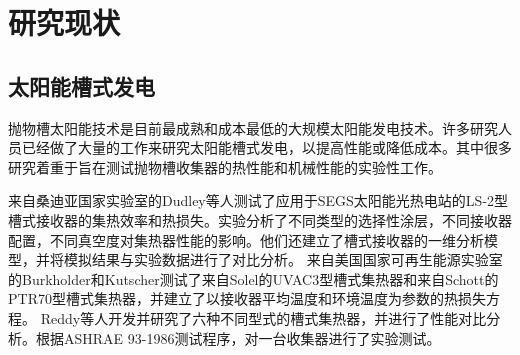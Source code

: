 \section{研究现状}

\subsection{太阳能槽式发电}

抛物槽太阳能技术是目前最成熟和成本最低的大规模太阳能发电技术\cite{Price2002}。许多研究人员已经做了大量的工作来研究太阳能槽式发电，以提高性能或降低成本。其中很多研究着重于旨在测试抛物槽收集器的热性能和机械性能的实验性工作。

来自桑迪亚国家实验室的Dudley等人\cite{Dudley1994}测试了应用于SEGS太阳能光热电站的LS-2型槽式接收器的集热效率和热损失。实验分析了不同类型的选择性涂层，不同接收器配置，不同真空度对集热器性能的影响。他们还建立了槽式接收器的一维分析模型，并将模拟结果与实验数据进行了对比分析。
来自美国国家可再生能源实验室的Burkholder和Kutscher\cite{Burkholder2009}测试了来自Solel的UVAC3型槽式集热器和来自Schott的PTR70型槽式集热器，并建立了以接收器平均温度和环境温度为参数的热损失方程。
Reddy等人开发并研究了六种不同型式的槽式集热器，并进行了性能对比分析。根据ASHRAE 93-1986测试程序，对一台收集器进行了实验测试。

